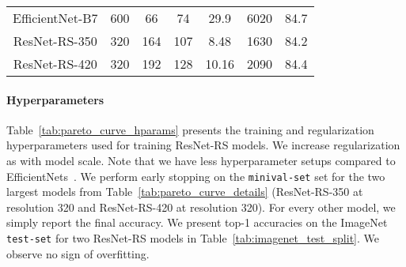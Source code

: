 \documentclass{article}
\begin{document}
\begin{table*}[h!]
\begin{center}
\begin{tabular}{ccccccc}
  EfficientNet-B7 & 600 & 66 & 74 & 29.9 & 6020 & 84.7 \\
  ResNet-RS-350 & 320 & 164 & 107 & 8.48 & 1630 & 84.2 \\
  ResNet-RS-420 & 320 & 192 & 128 & 10.16 & 2090 & 84.4 \\
  \bottomrule
\end{tabular}
\end{center}
\caption{\textbf{Details of ResNet-RS models in Pareto curve.} 
All models are trained for 350 epochs using the improvements mentioned in Section~\ref{sec:training_setups}. 
The exact hyperparameters for all ResNet-RS models are in Table~\ref{tab:pareto_curve_hparams}.
Latencies on Tesla V100 GPUs are measured with full precision (\texttt{float32}).
Latencies on TPUv3 are measured using \texttt{bfloat16} precision.
All latencies are measured with an initial training batch size of 128 images, which is divided by 2 until it fits onto the accelerator.} 
\label{tab:pareto_curve_details} 
\end{table*}

\paragraph{Hyperparameters}
Table~\ref{tab:pareto_curve_hparams} presents the training and regularization hyperparameters used for training ResNet-RS models.
We increase regularization as with model scale.
Note that we have less hyperparameter setups compared to EfficientNets~\citep{tan2019efficientnet}.
We perform early stopping on the \texttt{minival-set} set for the two largest models from Table~\ref{tab:pareto_curve_details} (ResNet-RS-350 at resolution 320 and ResNet-RS-420 at resolution 320).
For every other model, we simply report the final accuracy.
We present top-1 accuracies on the ImageNet \texttt{test-set} for two ResNet-RS models in Table~\ref{tab:imagenet_test_split}.
We observe no sign of overfitting.
\end{document}

